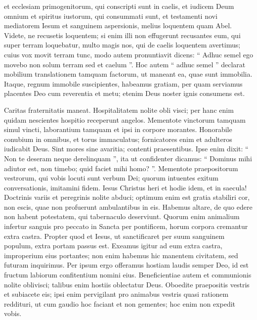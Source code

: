 \begin{biblechapter}
\begin{biblechapter}
\begin{biblechapter}
\begin{biblechapter}
\begin{biblechapter}
\begin{biblechapter}
\begin{biblechapter}
\begin{biblechapter}
\begin{biblechapter}
\begin{biblechapter}
\begin{biblechapter}
\begin{biblechapter}
\verse et ecclesiam primogenitorum, qui conscripti sunt in caelis, et iudicem Deum omnium et spiritus iustorum, qui consummati sunt, 
\verse et testamenti novi mediatorem Iesum et sanguinem aspersionis, melius loquentem quam Abel.
 \verse Videte, ne recusetis loquentem; si enim illi non effugerunt recusantes eum, qui super terram loquebatur, multo magis nos, qui de caelis loquentem avertimus; 
\verse cuius vox movit terram tunc, modo autem pronuntiavit dicens: “ Adhuc semel ego movebo non solum terram sed et caelum ”. 
\verse Hoc autem “ adhuc semel ” declarat mobilium translationem tamquam factorum, ut maneant ea, quae sunt immobilia.
 \verse Itaque, regnum immobile suscipientes, habeamus gratiam, per quam serviamus placentes Deo cum reverentia et metu; 
\verse etenim Deus noster ignis consumens est.
 
\begin{biblechapter}
\verse Caritas fraternitatis maneat. 
\verse Hospitalitatem nolite obli visci; per hanc enim quidam nescientes hospitio receperunt angelos. 
\verse Mementote vinctorum tamquam simul vincti, laborantium tamquam et ipsi in corpore morantes. 
\verse Honorabile conubium in omnibus, et torus immaculatus; fornicatores enim et adulteros iudicabit Deus.
 \verse Sint mores sine avaritia; contenti praesentibus. Ipse enim dixit: “ Non te deseram neque derelinquam ”, 
\verse ita ut confidenter dicamus:
 “ Dominus mihi adiutor est, non timebo; quid faciet mihi homo? ”.
 \verse Mementote praepositorum vestrorum, qui vobis locuti sunt verbum Dei; quorum intuentes exitum conversationis, imitamini fidem. 
\verse Iesus Christus heri et hodie idem, et in saecula! 
\verse Doctrinis variis et peregrinis nolite abduci; optimum enim est gratia stabiliri cor, non escis, quae non profuerunt ambulantibus in eis. 
\verse Habemus altare, de quo edere non habent potestatem, qui tabernaculo deserviunt. 
\verse Quorum enim animalium infertur sanguis pro peccato in Sancta per pontificem, horum corpora cremantur extra castra. 
\verse Propter quod et Iesus, ut sanctificaret per suum sanguinem populum, extra portam passus est. 
\verse Exeamus igitur ad eum extra castra, improperium eius portantes; 
\verse non enim habemus hic manentem civitatem, sed futuram inquirimus. 
\verse Per ipsum ergo offeramus hostiam laudis semper Deo, id est fructum labiorum confitentium nomini eius.
 \verse Beneficientiae autem et communionis nolite oblivisci; talibus enim hostiis oblectatur Deus.
 \verse Oboedite praepositis vestris et subiacete eis; ipsi enim pervigilant pro animabus vestris quasi rationem reddituri, ut cum gaudio hoc faciant et non gementes; hoc enim non expedit vobis.

\end{biblechapter}
\end{biblechapter}
\end{biblechapter}
\end{biblechapter}
\end{biblechapter}
\end{biblechapter}
\end{biblechapter}
\end{biblechapter}
\end{biblechapter}
\end{biblechapter}
\end{biblechapter}
\end{biblechapter}
\end{biblechapter}
